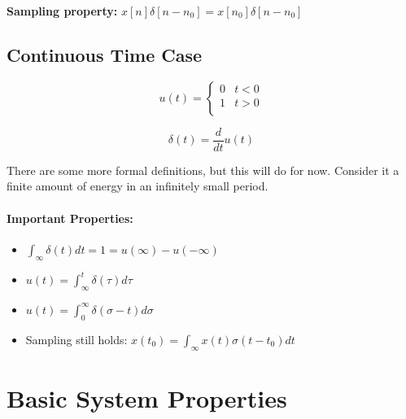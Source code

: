 \documentclass[a4paper,12pt]{report}
\begin{document}
\textbf{Sampling property: } $x[n] \delta[n-n_0] = x[n_0] \delta[n-n_0]$

\subsection{Continuous Time Case}

\begin{equation}
u(t) = 
\begin{cases}
	0 & t < 0 \\
	1 & t > 0 \\
\end{cases}
\end{equation}

\begin{equation}
\delta(t) = \frac{d}{dt} u(t)
\end{equation}

There are some more formal definitions, but this will do for now. Consider it a finite amount of energy in an infinitely small period. 

\paragraph{Important Properties: } 

\begin{itemize}
\item $\int_{\infty} \delta(t) dt = 1 = u(\infty) - u(-\infty)$
\item $u(t) = \int_{\infty}^{t} \delta(\tau) d\tau$
\item $u(t) = \int_{0}^{\infty} \delta(\sigma - t) d\sigma$
\item Sampling still holds: $x(t_0) = \int_{\infty} x(t) \sigma(t-t_0) dt$
\end{itemize}

\section{Basic System Properties}
\end{document}
